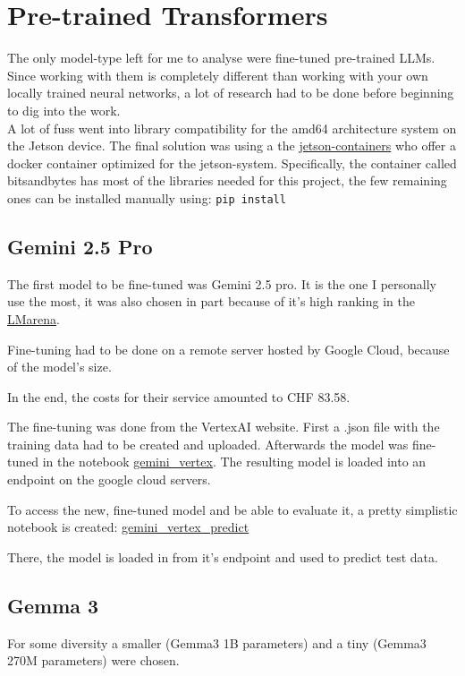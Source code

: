 \documentclass{article}
\begin{document}
\section{Pre-trained Transformers}

The only model-type left for me to analyse were fine-tuned pre-trained LLMs.
Since working with them is completely different than working with your own 
locally trained neural networks, a lot of research had to be done before 
beginning to dig into the work.
\\[1em]
A lot of fuss went into library compatibility for the amd64 architecture 
system on the Jetson device. The final solution was using a the 
\href{https://github.com/dusty-nv/jetson-containers}{jetson-containers} 
who offer a docker container optimized for the jetson-system. Specifically, 
the container called bitsandbytes has most of the libraries needed for this 
project, the few remaining ones can be installed manually using: \texttt{pip install}


\subsection{Gemini 2.5 Pro}
The first model to be fine-tuned was Gemini 2.5 pro. It is the one I 
personally use the most, it was also chosen in part because of it's high 
ranking in the \href{https://lmarena.ai/leaderboard}{LMarena}. 

Fine-tuning had to be done on a remote server hosted by Google Cloud, 
because of the model's size. 

In the end, the costs for their service amounted to CHF 83.58.

The fine-tuning was done from the VertexAI website. First a .json file with 
the training data had to be created and uploaded. Afterwards the model was 
fine-tuned in the notebook \href{https://github.com/AntonStantan/matura/blob/main/pre-trained-tranformers/gemini_vertex.ipynb}
{gemini\_vertex}. The resulting model is loaded into an endpoint on the 
google cloud servers.

To access the new, fine-tuned model and be able to evaluate it, a pretty 
simplistic notebook is created: \href{https://github.com/AntonStantan/matura/blob/main/pre-trained-tranformers/gemini_vertex_predict.ipynb}
{gemini\_vertex\_predict}

There, the model is loaded in from it's endpoint and used to predict test 
data. 

\subsection{Gemma 3}
For some diversity a smaller (Gemma3 1B parameters) and a tiny (Gemma3 270M 
parameters) were chosen.
\end{document}
